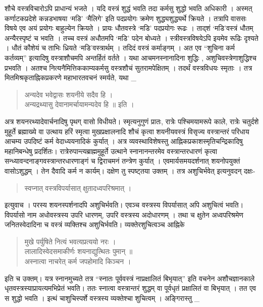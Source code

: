शौचे वस्त्रविचारोऽपि प्राधान्यं भजते । यदि वस्त्रं शुद्धं भवति तदा कर्मसु शुद्धो भवति अधिकारी । अस्मत् कर्णाटकप्रदेशे कन्नडभाषया ‘मडि’ ‘मैलिगे’ इति पदप्रयोगः क्रमेण शुद्ध्यशुद्ध्यर्थे क्रियते । तत्रापि वाससः विषये एव अयं प्रयोगः बाहुल्येन क्रियते । प्रायः धौतवस्त्रे ‘मडि’ पदप्रयोगः रूढः । ताद्शं ‘मडि’वस्त्रं धौतम् अन्यैरस्पृष्टं च भवति । तच्च वस्त्रं अधौतमपि ‘मडि’ पदेन बोध्यते । स्त्रीवस्त्रविषयेऽपि इयमेव रूढिः दृश्यते । धौतं कौशेयं च ताभिः ध्रियते ‘मडि’वस्त्रार्थम् । तदिदं वस्त्रं कर्माङ्गम् । अत एव “शुचिना कर्म कर्तव्यम्” इत्यादिषु वस्त्राशौचमपि अन्तर्हितं वर्तते । यथा आचमनस्नानादिना शुद्धिः , अशुचिवस्त्रेणाशुद्धिश्च प्रभवति । अतश्च नित्यनैमित्तिककाम्यकर्मसु वस्त्रशौचं सुतरामपेक्षितम् । तदर्थं वस्त्रविधयः स्मृताः । तत्र मितमिश्रकृताह्निकप्रकरणे महाभारतवचनं स्मर्यते, यथा _
\begin{verse}
अन्यदेव भवेद्वासः शयनीये सदैव हि ।\\
अन्यद्रथ्यासु देवानामर्चायामन्यदेव हि ॥ इति ।
\end{verse}
अत्र शयनरथ्यादेवार्चनादिषु  पृथग् वासो विधीयते। स्मृत्यनुगुणं प्रातः, रात्रेः पश्चिमयामरूपे काले, रात्रेः चतुर्दशे मुहूर्ते ब्रह्माख्ये वा उत्थाय हरिं स्मृत्वा मुखप्रक्षालनादि शौचं कृत्वा शयनीयवस्त्रं विसृज्य वस्त्रान्तरं परिधाय आचम्य उपदिष्टं कर्म वेदाध्ययनादिकं कुर्यात् । अत्र व्यवस्थाविशेषस्तु आह्निकप्रकाशस्मृतिचन्द्रिकादिषु महानिबन्धेषु प्रदर्शितः। रात्रेरुपान्त्यब्राह्ममुहूर्ते उत्थाने स्नानानन्तरमेव वस्त्रान्तरधारणं कृत्वा सन्ध्यावन्दनाङ्गवस्त्रान्तरधारणाङ्गं च द्विराचमनं तन्त्रेण कुर्यात् । एवमार्यसमयदर्शनात् शयनोपयुक्तं वासोऽशुद्धम् । तेन दैवादि कर्म न कार्यम्। दक्षेण तु स्पष्ट्तया उक्तम् । तत्र अशुचिर्भवेत् इत्यनुवदन् दक्षः- 
\begin{verse}
स्वप्नात् वस्त्रविपर्यासात् क्षुतादध्वपरिश्रमात् । 
\end{verse}
इत्युवाच । परस्य शयनस्पर्शनादपि अशुचिर्भवति। एवञ्च वस्त्रस्य विपर्यासात् अपि अशुचित्वं भवति। विपर्यासो नाम अधोवस्त्रस्य उपरि धारणम्, उपरि वस्त्रस्य अदोधारणम् । तथा च क्षुतेन अध्वपरिश्रमेण जनितस्वेदादिना च वस्त्रं व्यक्तिश्च अशुचिर्भवति। व्यक्तेरशुचित्वञ्च आह्निके 
\begin{verse}
मुखे पर्युषिते नित्यं भवत्यप्रत्ययो नरः । \\
लालादिस्वेदसमाकीर्णः शयनाद्युत्थितः पुमान् ॥\\
अस्नात्वा नाचरेत् कर्म जपहोमादि किञ्चन ।
\end{verse}
इति च उक्तम्। यत्र स्नानमुच्यते तत्र “स्नातः पूर्ववस्त्रं नाप्रक्षालितं बिभृयात्” इति वचनेन अशौचज्ञानकाले धृतवस्त्रस्याप्रायत्यमभिप्रेतं भवति। ततः स्नात्वा वस्त्रान्तरं शुद्धम् वा पूर्वधृतं प्रक्षालितं वा बिभृयात् । तत एव स शुद्धो भवति । इत्थं चाशुचिस्पर्शे वस्त्रस्य व्यक्तेश्चा शुचित्वम् । अङ्गिरास्तु _
